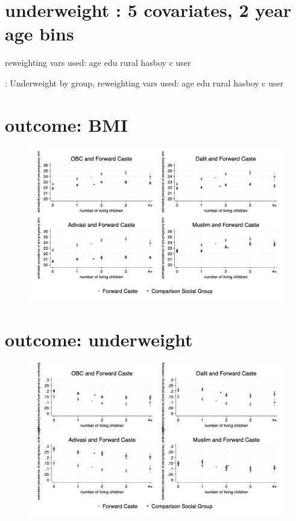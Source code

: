 \documentclass{article}
\begin{document}
\newpage 
\section{underweight : 5 covariates, 2 year age bins }

reweighting vars used: age edu rural hasboy c user

\begin{table}[H]
    \centering
    \footnotesize %
    \caption{: Underweight by group, reweighting vars used: age edu rural hasboy c user}
    \label{tab:sumstat}
\end{table}



\section{outcome: BMI}
\begin{figure}[H]
    \centering
    \includegraphics[width=\textwidth]{figures/prepreg_bmi_combined.png}
\end{figure}

\section{outcome: underweight}
\begin{figure}[H]
    \centering
    \includegraphics[width=\textwidth]{figures/prepreg_underweight_combined.png}
\end{figure}
\end{document}
